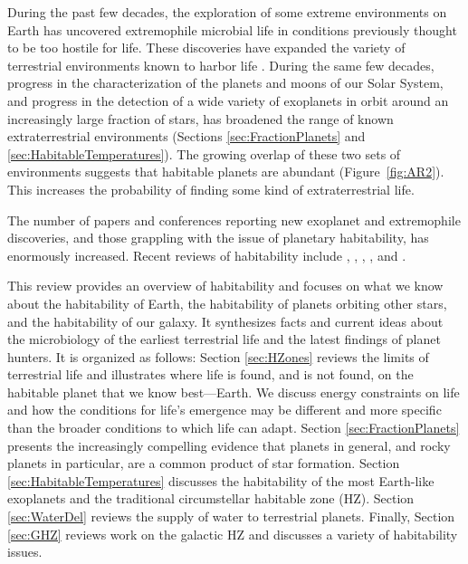 During the past few decades, the exploration of some extreme environments on Earth has uncovered extremophile microbial life in conditions previously thought to be too hostile for life. These discoveries have expanded the variety of terrestrial environments known to harbor life \citep{Rothschild2001, Stetter2006, Shock2007, Baross2007, Madigan2010, Pedersen2010}. During the same few decades, progress in the characterization of the planets and moons of our Solar System, and progress in the detection of a wide variety of exoplanets in orbit around an increasingly large fraction of stars, has broadened the range of known extraterrestrial environments (Sections \ref{sec:FractionPlanets} and \ref{sec:HabitableTemperatures}). The growing overlap of these two sets of environments suggests that habitable planets are abundant (Figure~\ref{fig:AR2}). This increases the probability of finding some kind of extraterrestrial life.

The number of papers and conferences reporting new exoplanet and extremophile discoveries, and those grappling with the issue of planetary habitability, has enormously increased. Recent reviews of habitability include \citet{Kasting2003}, \citet{Gaidos2005}, \citet{Hoehler2007a}, \citet{Fishbaugh2007}, \citet{Kopparapu2013} and \citet{Kasting2014}.

This review provides an overview of habitability and focuses on what we know about the habitability of Earth, the habitability of planets orbiting other stars, and the habitability of our galaxy. It synthesizes facts and current ideas about the microbiology of the earliest terrestrial life and the latest findings of planet hunters. It is organized as follows: Section \ref{sec:HZones} reviews the limits of terrestrial life and illustrates where life is found, and is not found, on the habitable planet that we know best—Earth. We discuss energy constraints on life and how the conditions for life's emergence may be different and more specific than the broader conditions to which life can adapt. Section \ref{sec:FractionPlanets} presents the increasingly compelling evidence that planets in general, and rocky planets in particular, are a common product of star formation. Section \ref{sec:HabitableTemperatures} discusses the habitability of the most Earth-like exoplanets and the traditional circumstellar habitable zone (HZ). Section \ref{sec:WaterDel} reviews the supply of water to terrestrial planets. Finally, Section \ref{sec:GHZ} reviews work on the galactic HZ and discusses a variety of habitability issues.

